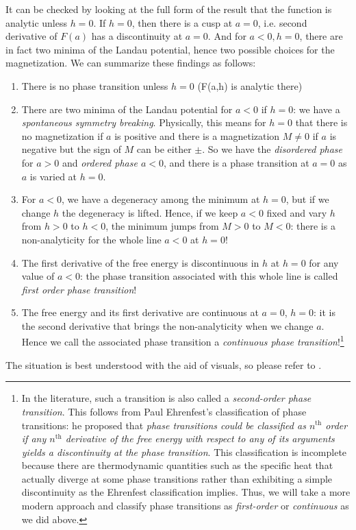 \documentclass[12pt]{article}
\numberwithin{equation}{section}
\begin{document}
It can be checked by looking at the full form of the result that the function is analytic unless $h=0$. If $h=0$, then there is a cusp at $a=0$, i.e. second derivative of $F(a)$ has a discontinuity at $a=0$. And for $a<0, h=0$, there are in fact two minima of the Landau potential, hence two possible choices for the magnetization. We can summarize these findings as follows:
\begin{enumerate}
	\item There is no phase transition unless $h=0$ (F(a,h) is analytic there)
	\item There are two minima of the Landau potential for $a<0$ if $h=0$: we have a \emph{spontaneous symmetry breaking}. Physically, this means for $h=0$ that there is no magnetization if $a$ is positive and there is a magnetization $M\ne 0$ if $a$ is negative but the sign of $M$ can be either $\pm$. So we have the \emph{disordered phase} for $a>0$ and \emph{ordered phase $a<0$}, and there is a phase transition at $a=0$ as $a$ is varied at $h=0$.
	\item For $a<0$, we have a degeneracy among the minimum at $h=0$, but if we change $h$ the degeneracy is lifted. Hence, if we keep $a<0$ fixed and vary $h$ from $h>0$ to $h<0$, the minimum jumps from $M>0$ to $M<0$: there is a non-analyticity for the whole line $a<0$ at $h=0$!
	\item The first derivative of the free energy is discontinuous in $h$ at $h=0$ for any value of $a<0$: the phase transition associated with this whole line is called \emph{first order phase transition}!
	
	\item The free energy and its first derivative are continuous at $a=0$, $h=0$: it is the second derivative that brings the non-analyticity when we change $a$. Hence we call the associated phase transition a \emph{continuous phase transition}!\footnote{In the literature, such a transition is also called a \emph{second-order phase transition}. This follows from Paul Ehrenfest's classification of phase transitions: he proposed that \emph{phase transitions could be classified as $n^{\text{th}}$ order if any $n^{\text{th}}$ derivative of the free energy with respect to any of its arguments yields a discontinuity at the phase transition}. This classification is incomplete because there are thermodynamic quantities such as the specific heat that actually diverge at some phase transitions rather than exhibiting a simple discontinuity as the Ehrenfest classification implies. Thus, we will take a more modern approach and classify phase transitions as \emph{first-order} or \emph{continuous} as we did above.}
\end{enumerate}
The situation is best understood with the aid of visuals, so please refer to \figref{\ref{fig: landau potential and phase transitions}}.
\end{document}

